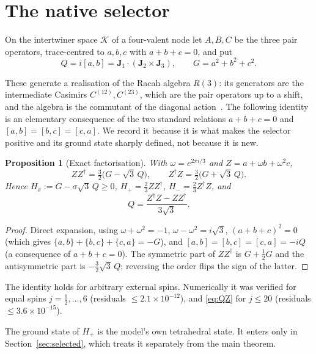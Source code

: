 \documentclass[11pt]{article}
\numberwithin{equation}{section}
\newtheorem{proposition}[theorem]{Proposition}
\theoremstyle{definition}
\theoremstyle{remark}
\begin{document}
\section{The native selector}\label{sec:selector}

On the intertwiner space $\mathcal K$ of a four-valent node let $A,B,C$ be the
three pair operators, trace-centred to $a,b,c$ with $a+b+c=0$, and put
\[
Q=i[a,b]=\mathbf J_1\cdot(\mathbf J_2\times\mathbf J_3),\qquad G=a^2+b^2+c^2 .
\]

These generate a realisation of the Racah algebra $R(3)$: its generators are the
intermediate Casimirs $C^{(12)},C^{(23)}$, which are the pair operators up to a
shift, and the algebra is the commutant of the diagonal action~\cite{Racah2019}.
The following identity is an elementary consequence of the two standard relations
$a+b+c=0$ and $[a,b]=[b,c]=[c,a]$. We record it because it is what makes the
selector positive and its ground state sharply defined, not because it is new.

\begin{proposition}[Exact factorisation]\label{prop:factor}
With $\omega=e^{2\pi i/3}$ and $Z=a+\omega b+\omega^2c$,
\[
ZZ^\dagger=\tfrac32\bigl(G-\sqrt3\,Q\bigr),\qquad
Z^\dagger Z=\tfrac32\bigl(G+\sqrt3\,Q\bigr).
\]
Hence $H_\sigma:=G-\sigma\sqrt3\,Q\ge0$, $H_+=\tfrac23ZZ^\dagger$,
$H_-=\tfrac23Z^\dagger Z$, and
\begin{equation}\label{eq:QZ}
Q=\frac{Z^\dagger Z-ZZ^\dagger}{3\sqrt3}.
\end{equation}
\end{proposition}

\begin{proof}
Direct expansion, using $\omega+\omega^2=-1$, $\omega-\omega^2=i\sqrt3$,
$(a+b+c)^2=0$ (which gives $\{a,b\}+\{b,c\}+\{c,a\}=-G$), and
$[a,b]=[b,c]=[c,a]=-iQ$ (a consequence of $a+b+c=0$). The symmetric part of
$ZZ^\dagger$ is $G+\tfrac12G$ and the antisymmetric part is $-\tfrac32\sqrt3\,Q$;
reversing the order flips the sign of the latter.
\end{proof}

The identity holds for arbitrary external spins. Numerically it was verified for
equal spins $j=\tfrac12,\dots,6$ (residuals $\le2.1\times10^{-12}$), and
\eqref{eq:QZ} for $j\le20$ (residuals $\le3.6\times10^{-15}$).

The ground state of $H_+$ is the model's own tetrahedral state. It enters only
in Section~\ref{sec:selected}, which treats it separately from the main theorem.
\end{document}
